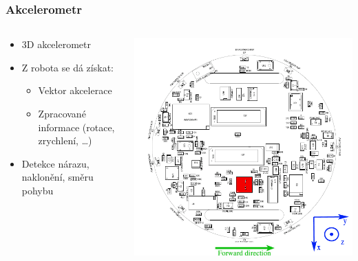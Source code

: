 \documentclass{beamer}
\begin{document}
\begin{frame}
    \frametitle{Akcelerometr}
    \begin{columns}
        \begin{column}{0.6\textwidth}
            \begin{itemize}
                \item 3D akcelerometr
                \item Z robota se dá získat:
                    \begin{itemize}
                        \item Vektor akcelerace
                        \item Zpracované informace (rotace, zrychlení, \ldots)
                    \end{itemize}
                \item Detekce nárazu, naklonění, směru pohybu
            \end{itemize}
        \end{column}

        \begin{column}{0.4\textwidth}
            \includegraphics[scale=0.2]{acc_emplacement.png}
        \end{column}
    \end{columns}
\end{frame}
\end{document}
